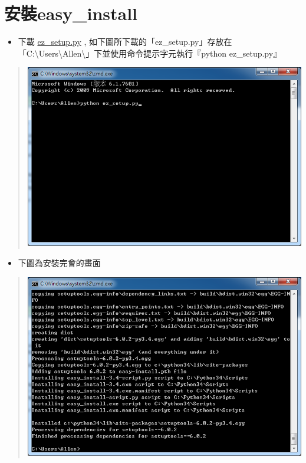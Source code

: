 \documentclass[letterpaper,10pt,english]{sphinxmanual}
\begin{document}
\section{安裝easy\_install}
\label{_doc/sphinx-doc-win/index:easy-install}\begin{itemize}
\item {} 
下載 \href{https://bitbucket.org/pypa/setuptools/raw/bootstrap/ez\_setup.py}{ez\_setup.py} , 如下圖所下載的「ez\_setup.py」存放在「C:\textbackslash{}Users\textbackslash{}Allen\textbackslash{}」下並使用命令提示字元執行『python ez\_setup.py』

\end{itemize}
\begin{quote}

\includegraphics{Python-ezSetup-001.png}
\end{quote}
\begin{itemize}
\item {} 
下圖為安裝完會的畫面

\end{itemize}
\begin{quote}

\includegraphics{Python-ezSetup-002.png}
\end{quote}
\end{document}
